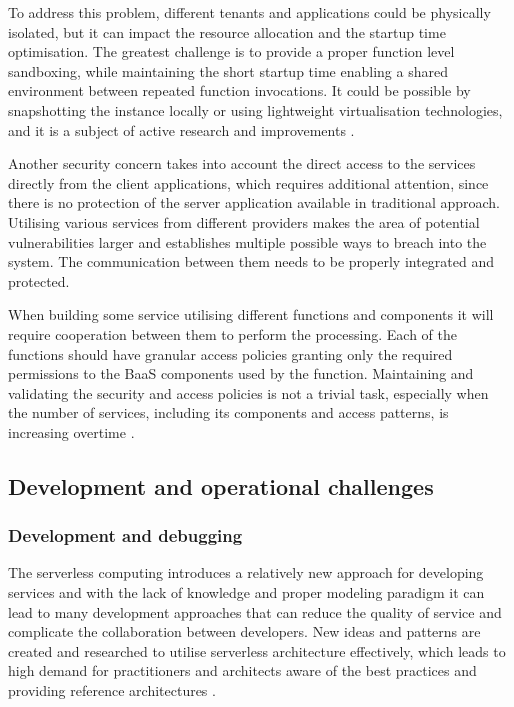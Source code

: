 To address this problem, different tenants and applications could be physically isolated, but it can impact the resource allocation and the startup time optimisation. The greatest challenge is to provide a proper function level sandboxing, while maintaining the short startup time enabling a shared environment between repeated function invocations. It could be possible by snapshotting the instance locally or using lightweight virtualisation technologies, and it is a subject of active research and improvements \cite{BerkeleyServerless}.

Another security concern takes into account the direct access to the services directly from the client applications, which requires additional attention, since there is no protection of the server application available in traditional approach. Utilising various services from different providers makes the area of potential vulnerabilities larger and establishes multiple possible ways to breach into the system. The communication between them needs to be properly integrated and protected.

When building some service utilising different functions and components it will require cooperation between them to perform the processing. Each of the functions should have granular access policies granting only the required permissions to the BaaS components used by the function. Maintaining and validating the security and access policies is not a trivial task, especially when the number of services, including its components and access patterns, is increasing overtime \cite{MartinFowlerServerless}.

\subsection{Development and operational challenges} \label{chapter:serverless-development-and-operational-challenges}

\subsubsection{Development and debugging} \label{chapter:serverless-development-and-debugging}

The serverless computing introduces a relatively new approach for developing services and with the lack of knowledge and proper modeling paradigm it can lead to many development approaches that can reduce the quality of service and complicate the collaboration between developers. New ideas and patterns are created and researched to utilise serverless architecture effectively, which leads to high demand for practitioners and architects aware of the best practices and providing reference architectures \cite{ServerlessComputingSurveyOfOpportunitiesChallengesApplications}.

